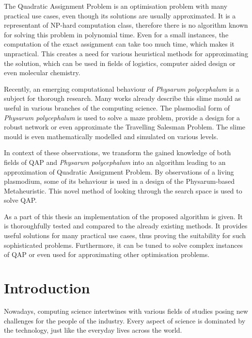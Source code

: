 \documentclass[english,a4paper,twoside]{ppfcmthesis}
\begin{document}
The Quadratic Assignment Problem is an optimisation problem with many practical use cases, even though its solutions are usually approximated. It is a representant of NP-hard computation class, therefore there is no algorithm known for solving this problem in polynomial time. Even for a small instances, the computation of the exact assignment can take too much time, which makes it unpractical. This creates a need for various heuristical methods for approximating the solution, which can be used in fields of logistics, computer aided design or even molecular chemistry.

Recently, an emerging computational behaviour of \textit{Physarum polycephalum} is a subject for thorough research. Many works already describe this slime mould as useful in various branches of the computing science. The plasmodial form of \textit{Physarum polycephalum} is used to solve a maze problem, provide a design for a robust network or even approximate the Travelling Salesman Problem. The slime mould is even mathematically modelled and simulated on various levels.

In context of these observations, we transform the gained knowledge of both fields of QAP and \textit{Physarum polycephalum} into an algorithm leading to an approximation of Quadratic Assignment Problem. By observations of a living plasmodium, some of its behaviour is used in a design of the Physarum-based Metaheuristic. This novel method of looking through the search space is used to solve QAP.

As a part of this thesis an implementation of the proposed algorithm is given. It is thoroughfully tested and compared to the already existing methods. It provides useful solutions for many practical use cases, thus proving the suitability for such sophisticated problems. Furthermore, it can be tuned to solve complex instances of QAP or even used for approximating other optimisation problems.
\cleardoublepage

\pagestyle{ppfcmthesis}%
\tableofcontents* \cleardoublepage%

\mainmatter%

\chapter{Introduction}
\label{chapter:introduction}

Nowadays, computing science intertwines with various fields of studies posing new challenges for the people of the industry. Every aspect of science is dominated by the technology, just like the everyday lives across the world.
\end{document}
